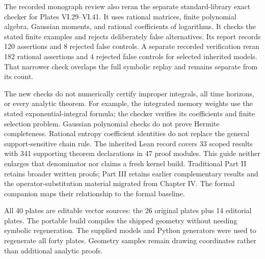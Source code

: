 The recorded monograph review also reran the separate standard-library exact checker for Plates VI.29--VI.41. It uses rational matrices, finite polynomial algebra, Gaussian moments, and rational coefficients of logarithms. It checks the stated finite examples and rejects deliberately false alternatives. Its report records 120 assertions and 8 rejected false controls. A separate recorded verification reran 182 rational assertions and 4 rejected false controls for selected inherited models. That narrower check overlaps the full symbolic replay and remains separate from its count.

The new checks do not numerically certify improper integrals, all time horizons, or every analytic theorem. For example, the integrated memory weights use the stated exponential-integral formula; the checker verifies its coefficients and finite selection problem. Gaussian polynomial checks do not prove Hermite completeness. Rational entropy coefficient identities do not replace the general support-sensitive chain rule.
The inherited Lean record covers 33 scoped results with 341 supporting theorem declarations in 47 proof modules. This guide neither enlarges that denominator nor claims a fresh kernel build. Traditional Part II retains broader written proofs; Part III retains earlier complementary results and the operator-substitution material migrated from Chapter IV. The formal companion maps their relationship to the formal baseline.

All 40 plates are editable vector sources: the 26 original plates plus 14 editorial plates. The portable build compiles the shipped geometry without needing symbolic regeneration. The supplied models and Python generators were used to regenerate all forty plates. Geometry samples remain drawing coordinates rather than additional analytic proofs.

